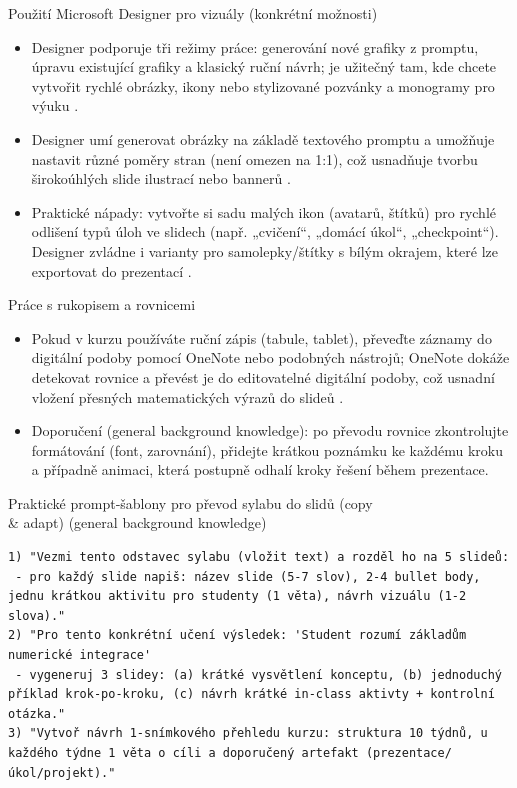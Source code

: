 Použití Microsoft Designer pro vizuály (konkrétní možnosti)
\begin{itemize}
  \item Designer podporuje tři režimy práce: generování nové grafiky z promptu, úpravu existující grafiky a klasický ruční návrh; je užitečný tam, kde chcete vytvořit rychlé obrázky, ikony nebo stylizované pozvánky a monogramy pro výuku \cite{kb_ai_101_tipu_pdf_04e4a115_page_51_1}.
  \item Designer umí generovat obrázky na základě textového promptu a umožňuje nastavit různé poměry stran (není omezen na 1:1), což usnadňuje tvorbu širokoúhlých slide ilustrací nebo bannerů \cite{kb_ai_101_tipu_pdf_04e4a115_page_51_1}.
  \item Praktické nápady: vytvořte si sadu malých ikon (avatarů, štítků) pro rychlé odlišení typů úloh ve slidech (např. „cvičení“, „domácí úkol“, „checkpoint“). Designer zvládne i varianty pro samolepky/štítky s bílým okrajem, které lze exportovat do prezentací \cite{kb_ai_101_tipu_pdf_04e4a115_page_51_1}.
\end{itemize}

Práce s rukopisem a rovnicemi
\begin{itemize}
  \item Pokud v kurzu používáte ruční zápis (tabule, tablet), převeďte záznamy do digitální podoby pomocí OneNote nebo podobných nástrojů; OneNote dokáže detekovat rovnice a převést je do editovatelné digitální podoby, což usnadní vložení přesných matematických výrazů do slideů \cite{kb_ai_101_tipu_pdf_04e4a115_page_8_1}.
  \item Doporučení (general background knowledge): po převodu rovnice zkontrolujte formátování (font, zarovnání), přidejte krátkou poznámku ke každému kroku a případně animaci, která postupně odhalí kroky řešení během prezentace.
\end{itemize}

Praktické prompt‑šablony pro převod sylabu do slidů (copy \\ \& adapt)  (general background knowledge)
\begin{verbatim}
1) "Vezmi tento odstavec sylabu (vložit text) a rozděl ho na 5 slideů:
 - pro každý slide napiš: název slide (5-7 slov), 2-4 bullet body, jednu krátkou aktivitu pro studenty (1 věta), návrh vizuálu (1-2 slova)."
2) "Pro tento konkrétní učení výsledek: 'Student rozumí základům numerické integrace'
 - vygeneruj 3 slidey: (a) krátké vysvětlení konceptu, (b) jednoduchý příklad krok-po-kroku, (c) návrh krátké in-class aktivty + kontrolní otázka."
3) "Vytvoř návrh 1-snímkového přehledu kurzu: struktura 10 týdnů, u každého týdne 1 věta o cíli a doporučený artefakt (prezentace/úkol/projekt)."
\end{verbatim}

